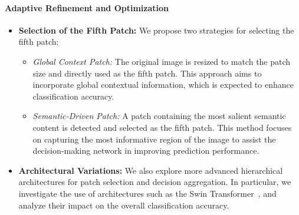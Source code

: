 \paragraph{Adaptive Refinement and Optimization}
\begin{itemize} \item \textbf{Selection of the Fifth Patch:}
We propose two strategies for selecting the fifth patch: \begin{itemize} \item \textit{Global Context Patch:} The original image is resized to match the patch size and directly used as the fifth patch. This approach aims to incorporate global contextual information, which is expected to enhance classification accuracy. \item \textit{Semantic-Driven Patch:} A patch containing the most salient semantic content is detected and selected as the fifth patch. This method focuses on capturing the most informative region of the image to assist the decision-making network in improving prediction performance. \end{itemize} \item \textbf{Architectural Variations:}
We also explore more advanced hierarchical architectures for patch selection and decision aggregation. In particular, we investigate the use of architectures such as the Swin Transformer~\cite{9718928}, and analyze their impact on the overall classification accuracy. \end{itemize}